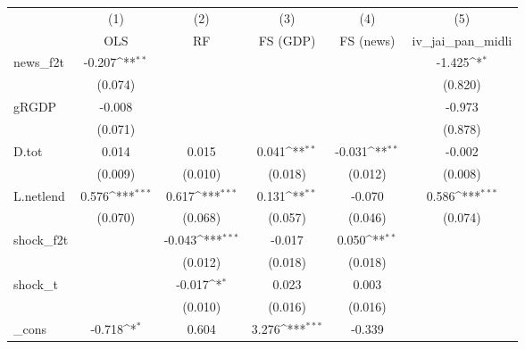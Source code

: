 {
\def\sym#1{\ifmmode^{#1}\else\(^{#1}\)\fi}
\begin{tabular}{l*{5}{c}}
\toprule
            &\multicolumn{1}{c}{(1)}&\multicolumn{1}{c}{(2)}&\multicolumn{1}{c}{(3)}&\multicolumn{1}{c}{(4)}&\multicolumn{1}{c}{(5)}\\
            &\multicolumn{1}{c}{OLS}&\multicolumn{1}{c}{RF}&\multicolumn{1}{c}{FS (GDP)}&\multicolumn{1}{c}{FS (news)}&\multicolumn{1}{c}{iv\_jai\_pan\_midli}\\
\midrule
news\_f2t    &      -0.207\sym{**} &                     &                     &                     &      -1.425\sym{*}  \\
            &     (0.074)         &                     &                     &                     &     (0.820)         \\
\addlinespace
gRGDP       &      -0.008         &                     &                     &                     &      -0.973         \\
            &     (0.071)         &                     &                     &                     &     (0.878)         \\
\addlinespace
D.tot       &       0.014         &       0.015         &       0.041\sym{**} &      -0.031\sym{**} &      -0.002         \\
            &     (0.009)         &     (0.010)         &     (0.018)         &     (0.012)         &     (0.008)         \\
\addlinespace
L.netlend   &       0.576\sym{***}&       0.617\sym{***}&       0.131\sym{**} &      -0.070         &       0.586\sym{***}\\
            &     (0.070)         &     (0.068)         &     (0.057)         &     (0.046)         &     (0.074)         \\
\addlinespace
shock\_f2t   &                     &      -0.043\sym{***}&      -0.017         &       0.050\sym{**} &                     \\
            &                     &     (0.012)         &     (0.018)         &     (0.018)         &                     \\
\addlinespace
shock\_t     &                     &      -0.017\sym{*}  &       0.023         &       0.003         &                     \\
            &                     &     (0.010)         &     (0.016)         &     (0.016)         &                     \\
\addlinespace
\_cons      &      -0.718\sym{*}  &       0.604         &       3.276\sym{***}&      -0.339         &                     \\

\end{tabular}}

